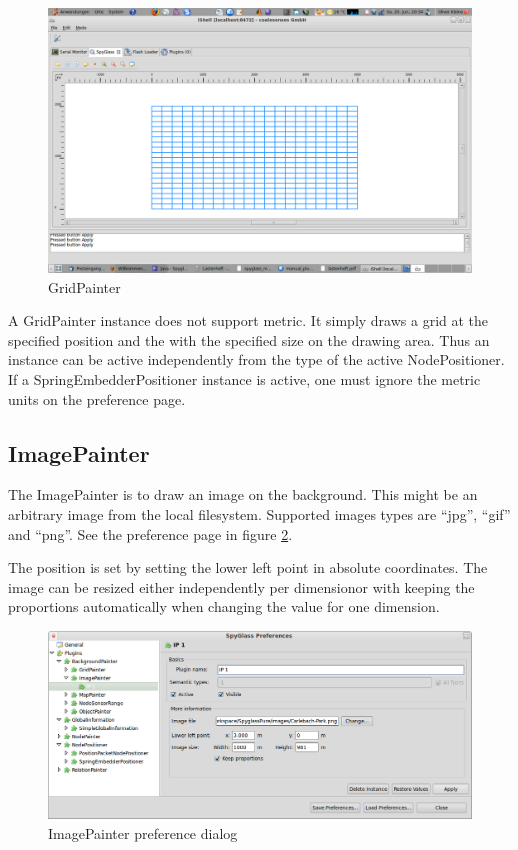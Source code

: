 \begin{figure}[htb]
  \begin{center}
    \includegraphics[width=13.2cm]{./pics/gridpainter}
    \caption{GridPainter}
    \label{pic:gp}
  \end{center}
\end{figure}

A GridPainter instance does not support metric. It simply draws a grid at the specified position and the with
the specified size on the drawing area. Thus an instance can be active independently from the type of the
active NodePositioner. If a SpringEmbedderPositioner instance is active, one must ignore the metric units
on the preference page.

\subsection{ImagePainter}

The ImagePainter is to draw an image on the background. This might be an arbitrary image from the local filesystem.
Supported images types are ``jpg'', ``gif'' and ``png''. See the preference page in figure \ref{pic:ip_preferences}.

The position is set by setting the lower left point in absolute coordinates. The image can be resized either
independently per dimensionor with keeping the proportions automatically when changing the value for one dimension.

\begin{figure}[htb]
  \begin{center}
    \includegraphics[width=13.2cm]{./pics/imagepainter_prefpage}
    \caption{ImagePainter preference dialog}
    \label{pic:ip_preferences}
  \end{center}
\end{figure}

